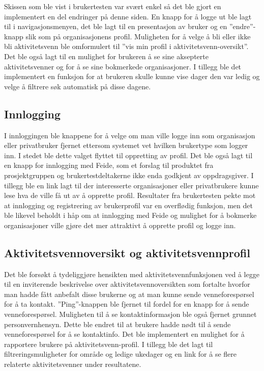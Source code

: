 Skissen som ble vist i brukertesten var svært enkel så det ble gjort en implementert en del endringer på denne siden. En knapp for å logge ut ble lagt til i navigasjonsmenyen, det ble lagt til en presentasjon av bruker og en ''endre''-knapp slik som på organisasjonens profil. Muligheten for å velge å bli eller ikke bli aktivitetsvenn ble omformulert til ''vis min profil i aktivitetsvenn-oversikt''. Det ble også lagt til en mulighet for brukeren å se sine aksepterte aktivitetsvenner og for å se sine bokmerkede organisasjoner. I tillegg ble det implementert en funksjon for at brukeren skulle kunne vise dager den var ledig og velge å filtrere søk automatisk på disse dagene.

\subsection{Innlogging}
 I innloggingen ble knappene for å velge om man ville logge inn som organisasjon eller privatbruker fjernet ettersom systemet vet hvilken brukertype som logger inn. I stedet ble dette valget flyttet til oppretting av profil. Det ble også lagt til en knapp for innlogging med Feide, som et forslag til produktet fra prosjektgruppen og brukertestdeltakerne ikke enda godkjent av oppdragsgiver. I tillegg ble en link lagt til der interesserte organisasjoner eller privatbrukere kunne lese hva de ville få ut av å opprette profil. Resultater fra brukertesten pekte mot at innlogging og registrering av brukerprofil var en overflødig funksjon, men det ble likevel beholdt i håp om at innlogging med Feide og mulighet for å bokmerke organisasjoner ville gjøre det mer attraktivt å opprette profil og logge inn.

 
 \subsection{Aktivitetsvennoversikt og aktivitetsvennprofil}
 
 Det ble forsøkt å tydeliggjøre hensikten med aktivitetsvennfunksjonen ved å legge til en inviterende beskrivelse over aktivitetsvennoversikten som fortalte hvorfor man hadde fått anbefalt disse brukerne og at man kunne sende venneforespørsel for å ta kontakt. ''Ping''-knappen ble fjernet til fordel for en knapp for å sende venneforespørsel. Muligheten til å se kontaktinformasjon ble også fjernet grunnet personvernhensyn. Dette ble endret til at brukere hadde nødt til å sende venneforespørsel for å se kontaktinfo. Det ble implementert en mulighet for å rapportere brukere på aktivitetsvenn-profil. I tillegg ble det lagt til filtreringsmuligheter for område og ledige ukedager og en link for å se flere relaterte aktivitetsvenner under resultatene.
 
